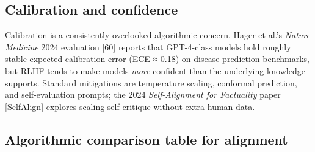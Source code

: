 \subsection{Calibration and confidence}\label{calibration-and-confidence}

Calibration is a consistently overlooked algorithmic concern. Hager et al.'s \emph{Nature Medicine} 2024 evaluation {[}60{]} reports that GPT-4-class models hold roughly stable expected calibration error (ECE ≈ 0.18) on disease-prediction benchmarks, but RLHF tends to make models \emph{more} confident than the underlying knowledge supports. Standard mitigations are temperature scaling, conformal prediction, and self-evaluation prompts; the 2024 \emph{Self-Alignment for Factuality} paper {[}SelfAlign{]} explores scaling self-critique without extra human data.

\subsection{Algorithmic comparison table for alignment}\label{algorithmic-comparison-table-for-alignment}

